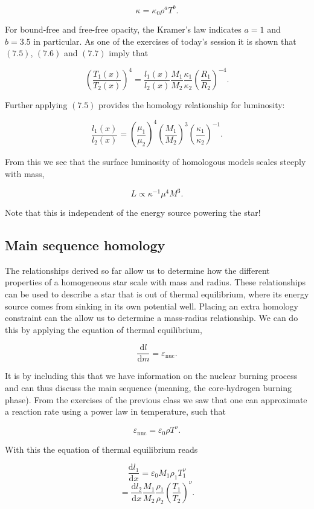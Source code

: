 \documentclass[twocolumn]{article}
\begin{document}
\[\kappa = \kappa_0 \rho^a T^b. \tag{7.7}\]

For bound-free and free-free opacity, the Kramer's law indicates \(a=1\)
and \(b=3.5\) in particular. As one of the exercises of today's session
it is shown that \((7.5)\), \((7.6)\) and \((7.7)\) imply that

\[\left(\frac{T_1(x)}{T_2(x)}\right)^4=\frac{l_1(x)}{l_2(x)}\frac{M_1}{M_2}\frac{\kappa_1}{\kappa_2}\left(\frac{R_1}{R_2}\right)^{-4}.\]

Further applying \((7.5)\) provides the homology relationship for
luminosity:

\[\boxed{\frac{l_1(x)}{l_2(x)}=\left(\frac{\mu_1}{\mu_2}\right)^4\left(\frac{M_1}{M_2}\right)^3\left(\frac{\kappa_1}{\kappa_2}\right)^{-1}}.\tag{7.8}\]

From this we see that the surface luminosity of homologous models scales
steeply with mass,

\[L\propto \kappa^{-1}\mu^{4}M^3.\]

Note that this is independent of the energy source powering the star!

\hypertarget{main-sequence-homology-1}{%
\subsection{Main sequence homology}\label{main-sequence-homology-1}}

The relationships derived so far allow us to determine how the different
properties of a homogeneous star scale with mass and radius. These
relationships can be used to describe a star that is out of thermal
equilibrium, where its energy source comes from sinking in its own
potential well. Placing an extra homology constraint can the allow us to
determine a mass-radius relationship. We can do this by applying the
equation of thermal equilibrium,

\[\frac{\mathrm{d}l}{\mathrm{d}m}=\varepsilon_\mathrm{nuc}.\]

It is by including this that we have information on the nuclear burning
process and can thus discuss the main sequence (meaning, the
core-hydrogen burning phase). From the exercises of the previous class
we saw that one can approximate a reaction rate using a power law in
temperature, such that

\[\varepsilon_\mathrm{nuc}=\varepsilon_0 \rho T^\nu.\]

With this the equation of thermal equilibrium reads

\[\frac{\mathrm{d}l_1}{\mathrm{d}x}=\varepsilon_0 M_1 \rho_1 T_1^\nu\]
\[=\frac{\mathrm{d}l_2}{\mathrm{d}x}\frac{M_1}{M_2}\frac{\rho_1}{\rho_2}\left(\frac{T_1}{T_2}\right)^\nu.\]
\end{document}
